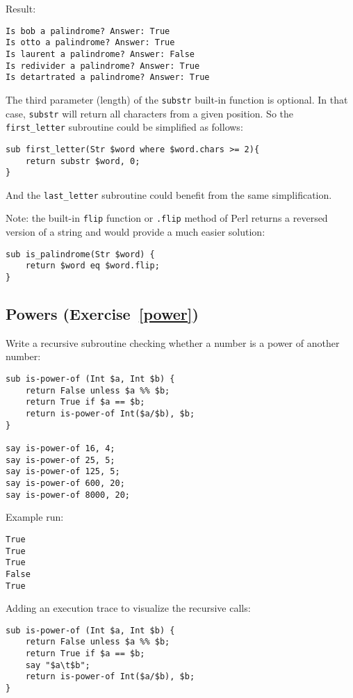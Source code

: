 Result:
\begin{verbatim}
Is bob a palindrome? Answer: True
Is otto a palindrome? Answer: True
Is laurent a palindrome? Answer: False
Is redivider a palindrome? Answer: True
Is detartrated a palindrome? Answer: True
\end{verbatim}

The third parameter (length) of the {\tt substr} built-in 
function is optional. In that case, {\tt substr} will return 
all characters from a given position. So the \verb'first_letter'  
subroutine could be simplified as follows:

\begin{verbatim}
sub first_letter(Str $word where $word.chars >= 2){
    return substr $word, 0;
}
\end{verbatim} 

And the \verb'last_letter' subroutine could benefit from the same 
simplification.

Note: the built-in {\tt flip} function or {\tt .flip} method 
of Perl returns a reversed version of a string and would 
provide a much easier solution:

\begin{verbatim}
sub is_palindrome(Str $word) {
    return $word eq $word.flip;
}
\end{verbatim}

\subsection{Powers (Exercise~\ref{power})}
\label{sol_power}

Write a recursive subroutine checking whether a number is 
a power of another number:

\begin{verbatim}
sub is-power-of (Int $a, Int $b) {
    return False unless $a %% $b;
    return True if $a == $b;
    return is-power-of Int($a/$b), $b;
}

say is-power-of 16, 4;
say is-power-of 25, 5;
say is-power-of 125, 5;
say is-power-of 600, 20;
say is-power-of 8000, 20;
\end{verbatim}
%

Example run:
\begin{verbatim}
True
True
True
False
True
\end{verbatim}

Adding an execution trace to visualize the recursive calls:

\begin{verbatim}
sub is-power-of (Int $a, Int $b) {     
    return False unless $a %% $b;      
    return True if $a == $b;           
    say "$a\t$b";                      
    return is-power-of Int($a/$b), $b; 
}                                      
\end{verbatim}

